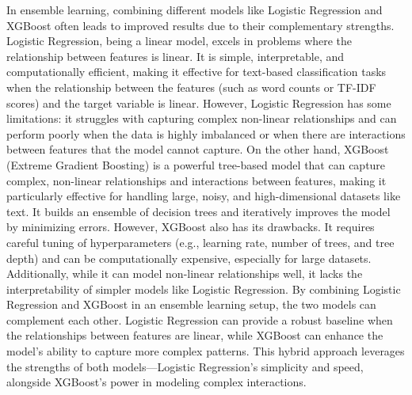 \noindent
In ensemble learning, combining different models like Logistic Regression and XGBoost often leads to improved results due to their complementary strengths. Logistic Regression, being a linear model, excels in problems where the relationship between features is linear. It is simple, interpretable, and computationally efficient, making it effective for text-based classification tasks when the relationship between the features (such as word counts or TF-IDF scores) and the target variable is linear. However, Logistic Regression has some limitations: it struggles with capturing complex non-linear relationships and can perform poorly when the data is highly imbalanced or when there are interactions between features that the model cannot capture. On the other hand, XGBoost (Extreme Gradient Boosting) is a powerful tree-based model that can capture complex, non-linear relationships and interactions between features, making it particularly effective for handling large, noisy, and high-dimensional datasets like text. It builds an ensemble of decision trees and iteratively improves the model by minimizing errors. However, XGBoost also has its drawbacks. It requires careful tuning of hyperparameters (e.g., learning rate, number of trees, and tree depth) and can be computationally expensive, especially for large datasets. Additionally, while it can model non-linear relationships well, it lacks the interpretability of simpler models like Logistic Regression. By combining Logistic Regression and XGBoost in an ensemble learning setup, the two models can complement each other. Logistic Regression can provide a robust baseline when the relationships between features are linear, while XGBoost can enhance the model's ability to capture more complex patterns. This hybrid approach leverages the strengths of both models—Logistic Regression's simplicity and speed, alongside XGBoost's power in modeling complex interactions.




